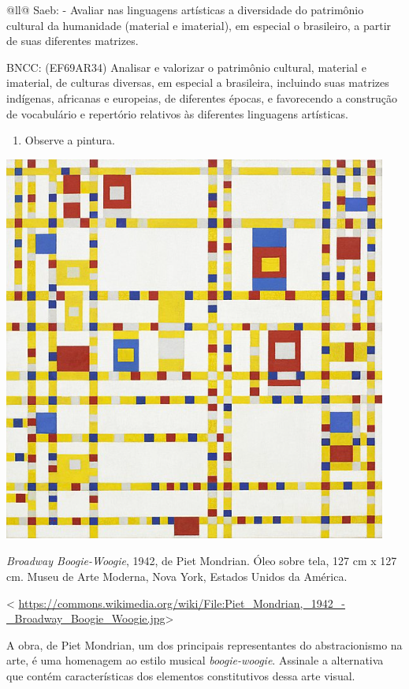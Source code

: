 \begin{itemize}
\begin{itemize}
\begin{escolha}[]{@{}ll@{}}
Saeb: - Avaliar nas linguagens artísticas a diversidade do patrimônio
cultural da humanidade (material e imaterial), em especial o brasileiro,
a partir de suas diferentes matrizes.

BNCC: (EF69AR34) Analisar e valorizar o patrimônio cultural, material e
imaterial, de culturas diversas, em especial a brasileira, incluindo
suas matrizes indígenas, africanas e europeias, de diferentes épocas, e
favorecendo a construção de vocabulário e repertório relativos às
diferentes linguagens artísticas.

\begin{enumerate}
\def\labelenumi{\arabic{enumi}.}
\item
  Observe a pintura.
\end{enumerate}

\includegraphics[width=4.96875in,height=5.01042in]{media/image40.png}

\emph{Broadway Boogie-Woogie}, 1942, de Piet Mondrian. Óleo sobre tela,
127 cm x 127 cm. Museu de Arte Moderna, Nova York, Estados Unidos da
América.

\textless{}
\url{https://commons.wikimedia.org/wiki/File:Piet_Mondrian,_1942_-_Broadway_Boogie_Woogie.jpg}\textgreater{}

A obra, de Piet Mondrian, um dos principais representantes do
abstracionismo na arte, é uma homenagem ao estilo musical
\emph{boogie-woogie}. Assinale a alternativa que contém características
dos elementos constitutivos dessa arte visual.


\end{escolha}
\end{itemize}
\end{itemize}
